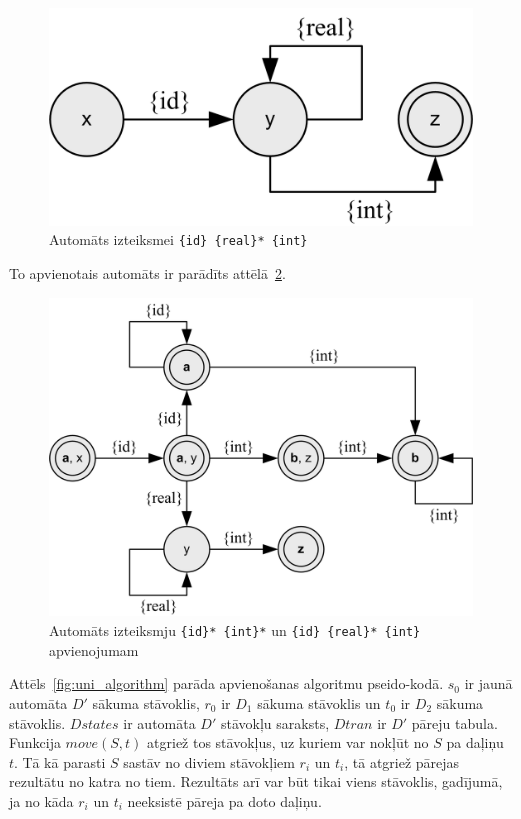 \begin{figure}[H]
  \centering
    \includegraphics[scale=1.5]{pictures/auto_m_2}
  \caption{\label{fig:auto_m_2}Automāts izteiksmei \texttt{\{id\} \{real\}* \{int\}}}
\end{figure}

To apvienotais automāts ir parādīts attēlā~\ref{fig:auto_merge}.

\begin{figure}[H]
  \centering
    \includegraphics[scale=1.5]{pictures/auto_merge}
  \caption{\label{fig:auto_merge}Automāts izteiksmju \texttt{\{id\}* \{int\}*} un \texttt{\{id\} \{real\}* \{int\}} apvienojumam}
\end{figure}

Attēls~\ref{fig:uni_algorithm} parāda apvienošanas algoritmu pseido-kodā. $s_0$ ir jaunā automāta $D'$ sākuma stāvoklis, $r_0$ ir $D_1$ sākuma stāvoklis un $t_0$ ir $D_2$ sākuma stāvoklis. $Dstates$ ir automāta $D'$ stāvokļu saraksts, $Dtran$ ir $D'$ pāreju tabula. Funkcija $move (S, t)$ atgriež tos stāvokļus, uz kuriem var nokļūt no $S$ pa daļiņu $t$. Tā kā parasti $S$ sastāv no diviem stāvokļiem $r_i$ un $t_i$, tā atgriež pārejas rezultātu no katra no tiem. Rezultāts arī var būt tikai viens stāvoklis, gadījumā, ja no kāda $r_i$ un $t_i$ neeksistē pāreja pa doto daļiņu.

